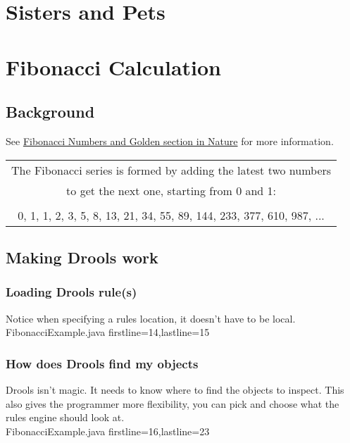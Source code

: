 \chapter{Sisters and Pets}

\chapter{Fibonacci Calculation}
\section {Background}
See \href{http://www.mcs.surrey.ac.uk/Personal/R.Knott/Fibonacci/fibnat.html}{Fibonacci Numbers and Golden section in Nature} for more information.  
\\
\begin {tabular}{|c|}
\hline
The Fibonacci series is formed by adding the latest two numbers\\
to get the next one, starting from 0 and 1:\\
\\
0, 1, 1, 2, 3, 5, 8, 13, 21, 34, 55, 89, 144, 233, 377, 610, 987, ...\\ 
\hline
\end {tabular}

\section {Making Drools work}
\subsection {Loading Drools rule(s)}
Notice when specifying a rules location, it doesn't have to be local.  
\\  {FibonacciExample.java} {firstline=14,lastline=15}

\subsection {How does Drools find my objects}
Drools isn't magic.
It needs to know where to find the objects to inspect. 
This also gives the programmer more flexibility, you can pick and choose what the rules engine should look at. 
\\  {FibonacciExample.java} {firstline=16,lastline=23}

